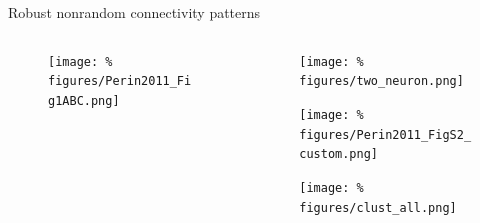 \begin{frame}{Robust nonrandom connectivity patterns}
  \begin{columns}
    \begin{column}{.45\textwidth}
      \minipage[c][0.75\textheight][s]{\columnwidth}
      
      \begin{figure}
        \centering
        \texttt{[image: \%
          figures/Perin2011\_Fig1ABC.png]} %
      \end{figure}
      

      
      \endminipage      
    \end{column}
    \begin{column}{.55\textwidth}


      \vspace{-0.2cm}
      
      \begin{figure}
        \centering
        \texttt{[image: \%
          figures/two\_neuron.png]} %
      \end{figure}

      \vfill
      

      \begin{figure}
        \centering
        \texttt{[image: \%
        figures/Perin2011\_FigS2\_custom.png]} %
      \end{figure}

      \vfill
      

      \begin{figure}
        \centering
        \texttt{[image: \%
          figures/clust\_all.png]} %
      \end{figure}
      
      \vfill

      
    \end{column}
  \end{columns}


  
\end{frame}


